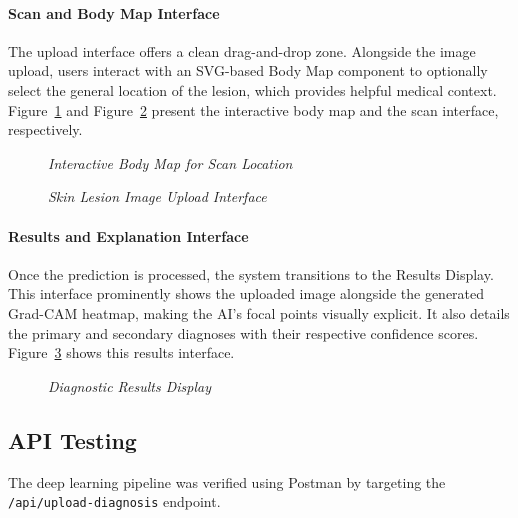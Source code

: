 \paragraph{Scan and Body Map Interface}
The upload interface offers a clean drag-and-drop zone. Alongside the image upload, users interact with an SVG-based Body Map component to optionally select the general location of the lesion, which provides helpful medical context. Figure~\ref{fig:sp2_body} and Figure~\ref{fig:ui_scan} present the interactive body map and the scan interface, respectively.

\begin{figure}[H]
	\centering
	\caption{\textit{Interactive Body Map for Scan Location}}
	\label{fig:sp2_body}
\end{figure}

\begin{figure}[H]
	\centering
	\caption{\textit{Skin Lesion Image Upload Interface}}
	\label{fig:ui_scan}
\end{figure}

\paragraph{Results and Explanation Interface}
Once the prediction is processed, the system transitions to the Results Display. This interface prominently shows the uploaded image alongside the generated Grad-CAM heatmap, making the AI's focal points visually explicit. It also details the primary and secondary diagnoses with their respective confidence scores. Figure~\ref{fig:ui_results} shows this results interface.

\begin{figure}[H]
	\centering
	\caption{\textit{Diagnostic Results Display}}
	\label{fig:ui_results}
\end{figure}

\subsection{API Testing}
The deep learning pipeline was verified using Postman by targeting the \texttt{/api/upload-diagnosis} endpoint.


